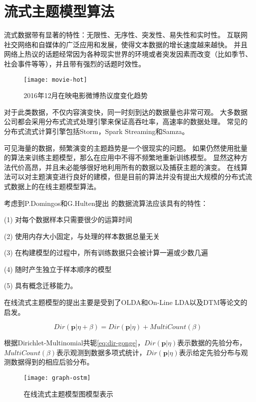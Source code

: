 \section{流式主题模型算法} 
流式数据带有显著的特性：无限性、无序性、突发性、易失性和实时性。
互联网社交网络和自媒体的广泛应用和发展，使得文本数据的增长速度越来越快。
并且网络上热议的话题经常因为各种现实世界的环境或者突发因素而改变（比如季节、社会事件等等），并且带有强烈的话题时效性。
\begin{figure}[htb]\centering
  \texttt{[image: movie-hot]}
  \caption{2016年12月在映电影微博热议度变化趋势}
  \label{fig:LDA}       %
\end{figure}

对于此类数据，不仅内容演变快，同一时刻到达的数据量也非常可观。
大多数据公司都会采用分布式流式处理引擎来保证高吞吐率，高速率的数据处理。
常见的分布式流式计算引擎包括Storm，Spark Streaming和Samza。

可见海量的数据，频繁演变的主题趋势是一个很现实的问题。
如果仍然使用批量的算法来训练主题模型，那么在应用中不得不频繁地重新训练模型。
显然这种方法代价高昂，并且未必能够很好地利用所有的数据以及捕获主题的演变。
在线算法可以对主题演变进行良好的建模，但是目前的算法并没有提出大规模的分布式流式数据上的在线主题模型算法。

考虑到P.Domingos和G.Hulten\cite{Domingos01catchingup}提出
的数据流算法应该具有的特性：

(1) 对每个数据样本只需要很少的运算时间

(2) 使用内存大小固定，与处理的样本数据总量无关

(3) 在构建模型的过程中，所有训练数据只会被计算一遍或少数几遍

(4) 随时产生独立于样本顺序的模型

(5) 具有概念迁移能力。

在线流式主题模型的提出主要是受到了OLDA\cite{hoffman2010online}和On-Line LDA\cite{alsumait2008on-line}以及DTM\cite{blei2006dynamic, wang2012continuous}等论文的启发。

\begin{equation}
\label{eq:dir-gonge}
Dir(\mathbf{p} | \eta + \beta ) = Dir(\mathbf{p} | \eta ) + MultiCount( \beta )
\end{equation}

根据Dirichlet-Multinomial共轭\ref{eq:dir-gonge}，$Dir(\mathbf{p} | \eta )$表示数据的先验分布，
$MultiCount(\beta)$表示观测到数据多项式统计，$Dir(\mathbf{p} | \eta)$表示给定先验分布与观测数据得到的相应后验分布。

\begin{figure}[htb]\centering
  \texttt{[image: graph-ostm]}
  \caption{在线流式主题模型图模型表示}
  \label{fig:OSTM}       %
\end{figure}

